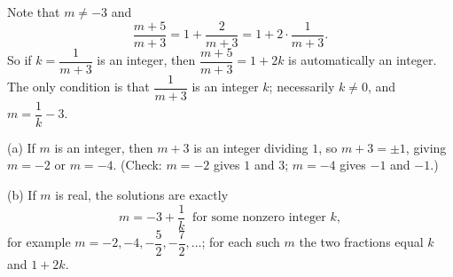 Note that $m\ne-3$ and
\[\dfrac{m+5}{m+3}=1+\dfrac{2}{m+3}=1+2\cdot\dfrac{1}{m+3}.\]
So if $k=\dfrac{1}{m+3}$ is an integer, then $\dfrac{m+5}{m+3}=1+2k$ is automatically an integer. The only condition is that $\dfrac{1}{m+3}$ is an integer $k$; necessarily $k\ne0$, and $m=\dfrac{1}{k}-3$.

(a) If $m$ is an integer, then $m+3$ is an integer dividing $1$, so $m+3=\pm1$, giving $\boxed{m=-2\text{ or }m=-4}$. (Check: $m=-2$ gives $1$ and $3$; $m=-4$ gives $-1$ and $-1$.)

(b) If $m$ is real, the solutions are exactly
\[\boxed{m=-3+\dfrac{1}{k}\ \text{ for some nonzero integer } k},\]
for example $m=-2,-4,-\dfrac{5}{2},-\dfrac{7}{2},\dots$; for each such $m$ the two fractions equal $k$ and $1+2k$.
